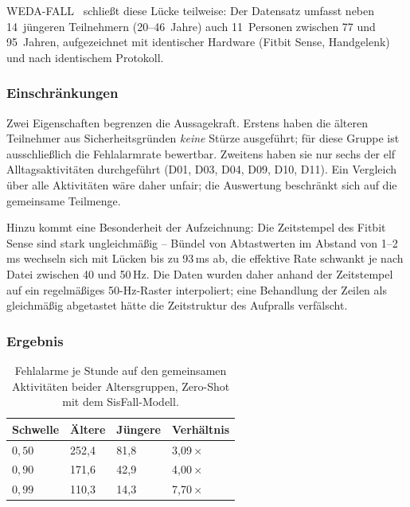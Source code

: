 \documentclass[11pt,a4paper,oneside]{report}
\begin{document}
WEDA-FALL~\cite{wedafall2023} schließt diese Lücke teilweise: Der
Datensatz umfasst neben 14~jüngeren Teilnehmern (20--46~Jahre)
auch 11~Personen zwischen 77 und 95~Jahren, aufgezeichnet mit
identischer Hardware (Fitbit Sense, Handgelenk) und nach identischem
Protokoll.

\subsubsection{Einschränkungen}

Zwei Eigenschaften begrenzen die Aussagekraft. Erstens haben die
älteren Teilnehmer aus Sicherheitsgründen \emph{keine} Stürze
ausgeführt; für diese Gruppe ist ausschließlich die Fehlalarmrate
bewertbar. Zweitens haben sie nur sechs der elf Alltagsaktivitäten
durchgeführt (D01, D03, D04, D09, D10, D11). Ein Vergleich über alle
Aktivitäten wäre daher unfair; die Auswertung beschränkt sich auf
die gemeinsame Teilmenge.

Hinzu kommt eine Besonderheit der Aufzeichnung: Die Zeitstempel des
Fitbit Sense sind stark ungleichmäßig -- Bündel von Abtastwerten im
Abstand von 1--2\,ms wechseln sich mit Lücken bis zu 93\,ms ab, die
effektive Rate schwankt je nach Datei zwischen 40 und 50\,Hz. Die
Daten wurden daher anhand der Zeitstempel auf ein regelmäßiges
50-Hz-Raster interpoliert; eine Behandlung der Zeilen als
gleichmäßig abgetastet hätte die Zeitstruktur des Aufpralls
verfälscht.

\subsubsection{Ergebnis}

\begin{table}[H]
\centering
\caption{Fehlalarme je Stunde auf den gemeinsamen Aktivitäten
         beider Altersgruppen, Zero-Shot mit dem SisFall-Modell.}
\label{tab:zielgruppe}
\small
\begin{tabularx}{0.85\textwidth}{X C{2.4cm} C{2.4cm} C{2.2cm}}
\toprule
\textbf{Schwelle} & \textbf{Ältere} & \textbf{Jüngere} & \textbf{Verhältnis} \\
\midrule
$0{,}50$ & 252,4 &  81,8 & 3,09\,$\times$ \\
$0{,}90$ & 171,6 &  42,9 & 4,00\,$\times$ \\
$0{,}99$ & 110,3 &  14,3 & 7,70\,$\times$ \\
\bottomrule
\end{tabularx}
\end{table}
\end{document}
